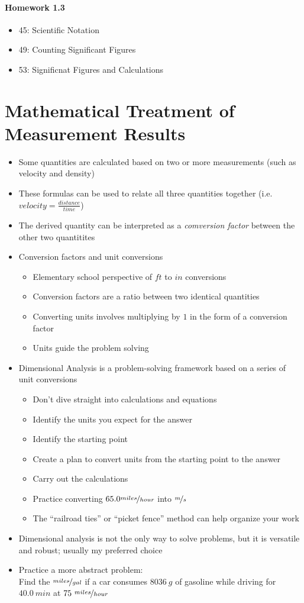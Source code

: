 \documentclass[12pt, openany, letterpaper]{memoir}
\begin{document}
\paragraph*{Homework 1.3}
\begin{itemize}
  \item 45: Scientific Notation
  \item 49: Counting Significant Figures
  \item 53: Significnat Figures and Calculations
\end{itemize}

\section{Mathematical Treatment of Measurement Results}
\begin{itemize}
  \item Some quantities are calculated based on two or more measurements (such as velocity and density)
  \item These formulas can be used to relate all three quantities together (i.e. $velocity = \frac{distance}{time}$)
  \item The derived quantity can be interpreted as a \emph{comversion factor} between the other two quantitites
  \item Conversion factors and unit conversions 
  \begin{itemize}
    \item Elementary school perspective of $ft$ to $in$ conversions
    \item Conversion factors are a ratio between two identical quantities
    \item Converting units involves multiplying by $1$ in the form of a conversion factor
    \item Units guide the problem solving
  \end{itemize}
  \item Dimensional Analysis is a problem-solving framework based on a series of unit conversions
  \begin{itemize}
    \item Don't dive straight into calculations and equations
    \item Identify the units you expect for the answer
    \item Identify the starting point
    \item Create a plan to convert units from the starting point to the answer
    \item Carry out the calculations
    \item Practice converting $65.0\nicefrac{miles}{hour}$ into $\nicefrac{m}{s}$
    \item The ``railroad ties'' or ``picket fence'' method can help organize your work
  \end{itemize}
  \item Dimensional analysis is not the only way to solve problems, but it is versatile and robust; usually my preferred choice
  \item Practice a more abstract problem:
    \\ Find the $\nicefrac{miles}{gal}$ if a car consumes $8036~g$ of gasoline while driving for $40.0~min$ at $75~\nicefrac{miles}{hour}$
\end{itemize}
\end{document}
